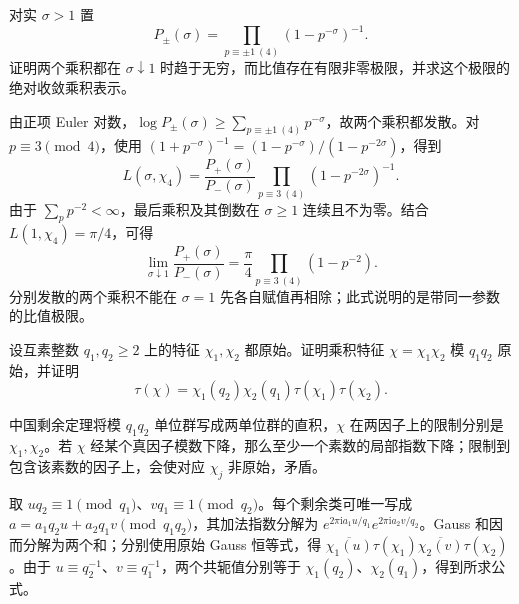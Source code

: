 \begin{exercise}\label{b3:ex:D-4}
对实 \(\sigma>1\) 置
\[
 P_\pm(\sigma)=\prod_{p\equiv\pm1\ (4)}(1-p^{-\sigma})^{-1}.
\]
证明两个乘积都在 \(\sigma\downarrow1\) 时趋于无穷，而比值存在有限非零极限，并求这个极限的绝对收敛乘积表示。
\end{exercise}
\begin{solution}
由正项 Euler 对数，\(\log P_\pm(\sigma)\ge\sum_{p\equiv\pm1\ (4)}p^{-\sigma}\)，故两个乘积都发散。对 \(p\equiv3\pmod4\)，使用
\((1+p^{-\sigma})^{-1}=(1-p^{-\sigma})/(1-p^{-2\sigma})\)，得到
\[
 L(\sigma,\chi_4)=\frac{P_+(\sigma)}{P_-(\sigma)}
                  \prod_{p\equiv3\ (4)}(1-p^{-2\sigma})^{-1}.
\]
由于 \(\sum_pp^{-2}<\infty\)，最后乘积及其倒数在 \(\sigma\ge1\) 连续且不为零。结合 \(L(1,\chi_4)=\pi/4\)，可得
\[
 \lim_{\sigma\downarrow1}\frac{P_+(\sigma)}{P_-(\sigma)}
   =\frac\pi4\prod_{p\equiv3\ (4)}(1-p^{-2}).
\]
分别发散的两个乘积不能在 \(\sigma=1\) 先各自赋值再相除；此式说明的是带同一参数的比值极限。
\end{solution}

\begin{exercise}\label{b3:ex:D-5}
设互素整数 \(q_1,q_2\ge2\) 上的特征 \(\chi_1,\chi_2\) 都原始。证明乘积特征 \(\chi=\chi_1\chi_2\) 模 \(q_1q_2\) 原始，并证明
\[
 \tau(\chi)=\chi_1(q_2)\chi_2(q_1)\tau(\chi_1)\tau(\chi_2).
\]
\end{exercise}
\begin{solution}
中国剩余定理将模 \(q_1q_2\) 单位群写成两单位群的直积，\(\chi\) 在两因子上的限制分别是 \(\chi_1,\chi_2\)。若 \(\chi\) 经某个真因子模数下降，那么至少一个素数的局部指数下降；限制到包含该素数的因子上，会使对应 \(\chi_j\) 非原始，矛盾。

取 \(u q_2\equiv1\pmod{q_1}\)、\(v q_1\equiv1\pmod{q_2}\)。每个剩余类可唯一写成
\(a=a_1q_2u+a_2q_1v\pmod{q_1q_2}\)，其加法指数分解为
\(e^{2\pi\mathrm{i}a_1u/q_1}e^{2\pi\mathrm{i}a_2v/q_2}\)。Gauss 和因而分解为两个和；分别使用原始 Gauss 恒等式，得
\(\overline{\chi_1(u)}\tau(\chi_1)\overline{\chi_2(v)}\tau(\chi_2)\)。由于 \(u\equiv q_2^{-1}\)、\(v\equiv q_1^{-1}\)，两个共轭值分别等于 \(\chi_1(q_2)\)、\(\chi_2(q_1)\)，得到所求公式。
\end{solution}

